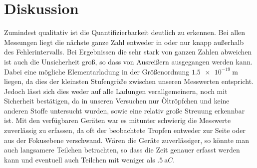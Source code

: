 \section{Diskussion}
Zumindest qualitativ ist die Quantifizierbarkeit deutlich zu erkennen. Bei allen Messungen liegt die nächste ganze Zahl entweder in oder nur knapp außerhalb des Fehlerintervalls. Bei Ergebnissen die sehr stark von ganzen Zahlen abweichen ist auch die Unsicherheit groß, so dass von Ausreißern ausgegangen werden kann. Dabei eine mögliche Elementarladung in der Größenordnung $ \SI{1.5e-19}{\meter} $ liegen, da dies der kleinsten Stufengröße zwischen unseren Messwerten entspricht. Jedoch lässt sich dies weder auf alle Ladungen verallgemeinern, noch mit Sicherheit bestätigen, da in unseren Versuchen nur Öltröpfchen und keine anderen Stoffe untersucht wurden, sowie eine relativ große Streuung erkennbar ist. Mit den verfügbaren Geräten war es mitunter schwierig die Messwerte zuverlässig zu erfassen, da oft der beobachtete Tropfen entweder zur Seite oder aus der Fokusebene verschwand. Wären die Geräte zuverlässiger, so könnte man auch langsamere Teilchen betrachten, so dass die Zeit genauer erfasst werden kann und eventuell auch Teilchen mit weniger als $ \SI{.5}{\atto C} $.
